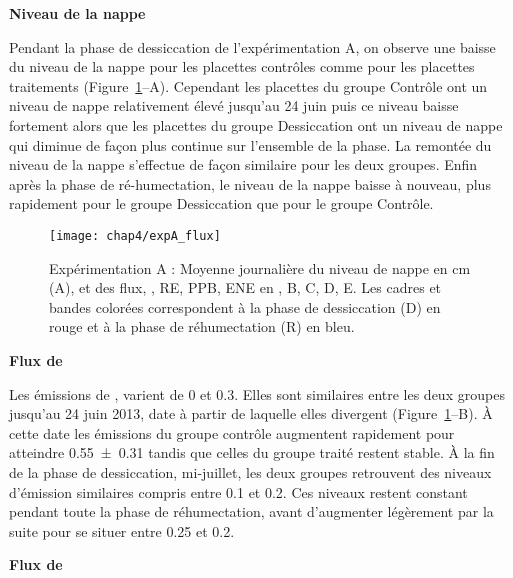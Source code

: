 \textbf{Niveau de la nappe}

Pendant la phase de dessiccation de l'expérimentation A, on observe une baisse du niveau de la nappe pour les placettes contrôles comme pour les placettes traitements (Figure~\ref{fig:HMzi}--A).
Cependant les placettes du groupe Contrôle ont un niveau de nappe relativement élevé jusqu'au 24 juin puis ce niveau baisse fortement alors que les placettes du groupe Dessiccation ont un niveau de nappe qui diminue de façon plus continue sur l'ensemble de la phase.
La remontée du niveau de la nappe s'effectue de façon similaire pour les deux groupes.
Enfin après la phase de ré-humectation, le niveau de la nappe baisse à nouveau, plus rapidement pour le groupe Dessiccation que pour le groupe Contrôle.


\begin{figure}
\centering
\texttt{[image: chap4/expA\_flux]}
\caption{Expérimentation A : Moyenne journalière du niveau de nappe en cm (A), et des flux, \chh, RE, PPB, ENE en \si{\uml}, B, C, D, E. Les cadres et bandes colorées correspondent à la phase de dessiccation (D) en rouge et à la phase de réhumectation (R) en bleu.}
\label{fig:HMzi}
\end{figure}

\textbf{Flux de \chh}

Les émissions de \chh, varient de 0 et \SI{0.3}{\uml}.
Elles sont similaires entre les deux groupes jusqu'au 24 juin 2013, date à partir de laquelle elles divergent (Figure~\ref{fig:HMzi}--B).
À cette date les émissions du groupe contrôle augmentent rapidement pour atteindre \SI{0.55(031)}{\uml} tandis que celles du groupe traité restent stable.
À la fin de la phase de dessiccation, mi-juillet, les deux groupes retrouvent des niveaux d'émission similaires compris entre \num{0.1} et \SI{0.2}{\uml}.
Ces niveaux restent constant pendant toute la phase de réhumectation, avant d'augmenter légèrement par la suite pour se situer entre \SI{0.25}{\uml} et \SI{0.2}{\uml}.

\textbf{Flux de \coo}

